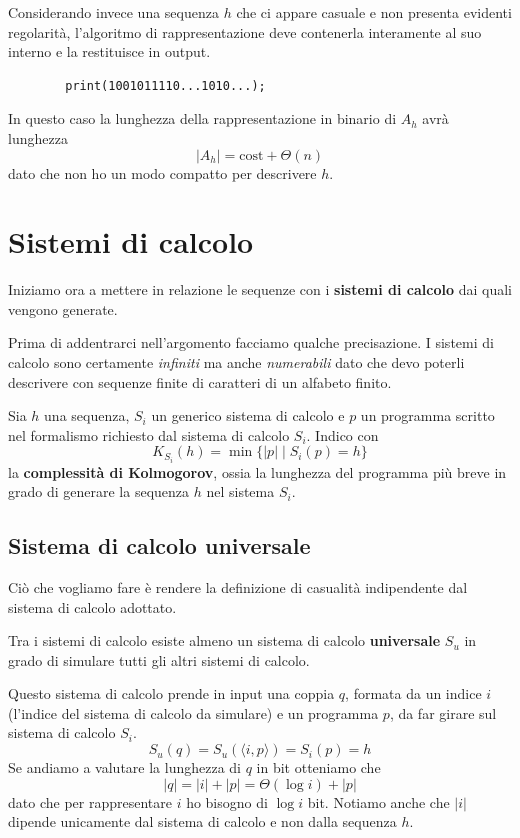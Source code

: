 \begin{example}
	Considerando invece una sequenza $h$ che ci appare casuale e non presenta evidenti regolarit\`a, l'algoritmo di
	rappresentazione deve contenerla interamente al suo interno e la restituisce in output.
	\begin{lstlisting}
		print(1001011110...1010...);
	\end{lstlisting}
	In questo caso la lunghezza della rappresentazione in binario di $A_h$ avr\`a lunghezza
	\[ |A_h| = \text{cost} + \Theta(n) \]
	dato che non ho un modo compatto per descrivere $h$.
\end{example}

\section{Sistemi di calcolo}\label{sistemi_calcolo}
Iniziamo ora a mettere in relazione le sequenze con i \textbf{sistemi di calcolo} dai quali vengono generate.

Prima di addentrarci nell'argomento facciamo qualche precisazione. I sistemi di calcolo sono certamente \emph{infiniti}
ma anche \emph{numerabili} dato che devo poterli descrivere con sequenze finite di caratteri di un alfabeto finito.

\begin{definition}
	Sia $h$ una sequenza, $S_i$ un generico sistema di calcolo e $p$ un programma scritto nel formalismo richiesto dal
	sistema di calcolo $S_i$. Indico con
	\[ K_{S_i}(h) = \min\{ |p| \mid S_i(p) = h \} \]
	la \textbf{complessit\`a di Kolmogorov}, ossia la lunghezza del programma pi\`u breve in grado di generare la
	sequenza $h$ nel sistema $S_i$.
\end{definition}

\subsection{Sistema di calcolo universale}
Ci\`o che vogliamo fare \`e rendere la definizione di casualit\`a indipendente dal sistema di calcolo adottato.

Tra i sistemi di calcolo esiste almeno un sistema di calcolo \textbf{universale} $S_u$ in grado di simulare tutti gli
altri sistemi di calcolo.

Questo sistema di calcolo prende in input una coppia $q$, formata da un indice $i$ (l'indice del sistema di calcolo da
simulare) e un programma $p$, da far girare sul sistema di calcolo $S_i$.
\[ S_u(q) =  S_u (\langle i, p \rangle) = S_i (p) = h \]
Se andiamo a valutare la lunghezza di $q$ in bit otteniamo che
\[ |q| = |i| + |p| = \Theta (\log i) + |p| \]
dato che per rappresentare $i$ ho bisogno di $\log i$ bit. Notiamo anche che $|i|$ dipende unicamente dal sistema di
calcolo e non dalla sequenza $h$.

